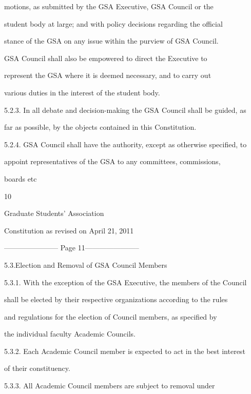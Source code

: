 \documentclass{article}
\begin{document}
motions,  as  submitted  by  the  GSA  Executive,  GSA  Council  or  the  

student body at large; and with policy decisions regarding the official  

stance of the GSA on any issue within the purview of  GSA Council.  

GSA  Council  shall  also  be  empowered  to  direct  the  Executive  to  

represent  the  GSA  where  it  is  deemed  necessary,  and  to  carry  out  

various duties in the interest of the student body.  



5.2.3. In all debate and decision-making the GSA Council shall be guided, as  

far as possible, by the objects contained in this Constitution.  



5.2.4. GSA Council shall have the authority, except as otherwise specified, to  

appoint representatives of the GSA to any committees, commissions,  

boards etc  



 

     10  



       Graduate Students’ Association  



  Constitution as revised on April 21, 2011  


----------------------- Page 11-----------------------

5.3.Election and Removal of GSA Council Members  



5.3.1. With the exception of the GSA Executive, the members of the Council  

shall be elected by their respective organizations according to the rules  

and regulations for the  election of Council  members, as specified by  

the individual faculty Academic Councils.  



5.3.2. Each Academic Council member is expected to act in the best interest  

of their constituency.  



5.3.3. All   Academic   Council   members   are   subject   to   removal   under  
\end{document}
